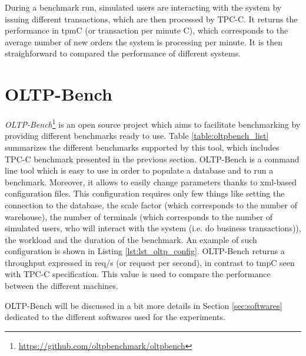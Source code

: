 During a benchmark run, simulated users are interacting with the system by issuing different transactions, which are then processed by TPC-C.
It returns the performance in tpmC (or transaction per minute C), which corresponds to the average number of new orders the system is processing per minute.
It is then straighforward to compared the performance of different systems.



\section{OLTP-Bench}
\textit{OLTP-Bench}\footnote{\url{https://github.com/oltpbenchmark/oltpbench}} is an open source project which aims to facilitate benchmarking by providing different benchmarks ready to use. 
Table \ref{table:oltpbench_list} summarizes the different benchmarks supported by this tool, which includes TPC-C benchmark presented in the previous section.
OLTP-Bench is a command line tool which is easy to use in order to populate a database and to run a benchmark.
Moreover, it allows to easily change parameters thanks to xml-based configuration files.
This configuration requires only few things like setting the connection to the database, the scale factor (which corresponds to the number of warehouse), the number of terminals (which corresponds to the number of simulated users, who will interact with the system (i.e. do business transactions)), the workload and the duration of the benchmark.
An example of such configuration is shown in Listing \ref{lst:lst_oltp_config}.
OLTP-Bench returns a throughput expressed in req/s (or request per second), in contrast to tmpC seen with TPC-C specification.
This value is used to compare the performance between the different machines.

OLTP-Bench will be discussed in a bit more details in Section \ref{sec:softwares} dedicated to the different softwares used for the experiments.

